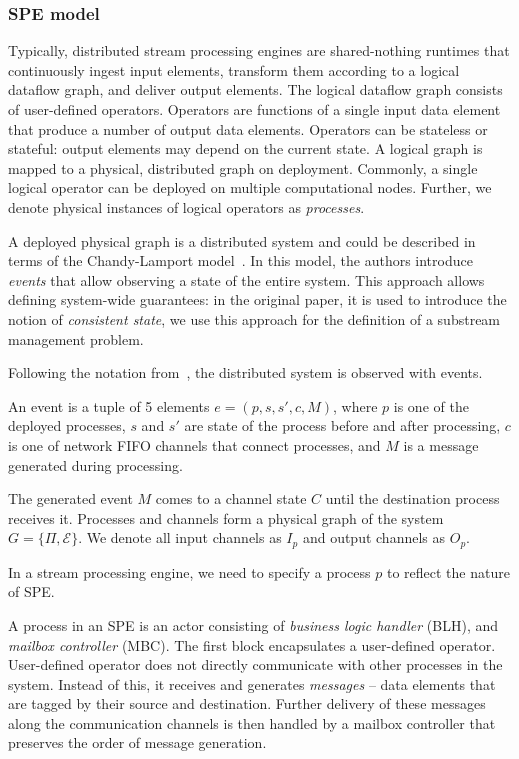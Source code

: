 \subsubsection{SPE model}

Typically, distributed stream processing engines are shared-nothing runtimes that continuously ingest input elements, transform them according to a logical dataflow graph, and deliver output elements. The logical dataflow graph consists of user-defined operators. Operators are functions of a single input data element that produce a number of output data elements. Operators can be stateless or stateful: output elements may depend on the current state. A logical graph is mapped to a physical, distributed graph on deployment. Commonly, a single logical operator can be deployed on multiple computational nodes. Further, we denote physical instances of logical operators as {\em processes}.

A deployed physical graph is a distributed system and could be described in terms of the Chandy-Lamport model~\cite{Chandy:1985:DSD:214451.214456, carbone2018scalable}. In this model, the authors introduce \textit{events} that allow observing a state of the entire system. This approach allows defining system-wide guarantees: in the original paper, it is used to introduce the notion of {\em consistent state}, we use this approach for the definition of a substream management problem.

Following the notation from~\cite{Chandy:1985:DSD:214451.214456, carbone2018scalable}, the distributed system is observed with events. 

\begin{definition}[Event]
An event is a tuple of 5 elements $e = (p, s, s', c, M)$, where $p$ is one of the deployed processes, $s$ and $s'$ are state of the process before and after processing, $c$ is one of network FIFO channels that connect processes, and $M$ is a message generated during processing.
\end{definition}

The generated event $M$ comes to a channel state $C$ until the destination process receives it. Processes and channels form a physical graph of the system $G=\{\Pi,\mathcal{E}\}$. We denote all input channels as $I_p$ and output channels as $O_p$.

In a stream processing engine, we need to specify a process $p$ to reflect the nature of SPE. 

\begin{definition}[Process]
A process in an SPE is an actor consisting of {\em business logic handler} (BLH), and {\em mailbox controller} (MBC). The first block encapsulates a user-defined operator. User-defined operator does not directly communicate with other processes in the system. Instead of this, it receives and generates {\em messages} -- data elements that are tagged by their source and destination. Further delivery of these messages along the communication channels is then handled by a mailbox controller that preserves the order of message generation.
\end{definition}

